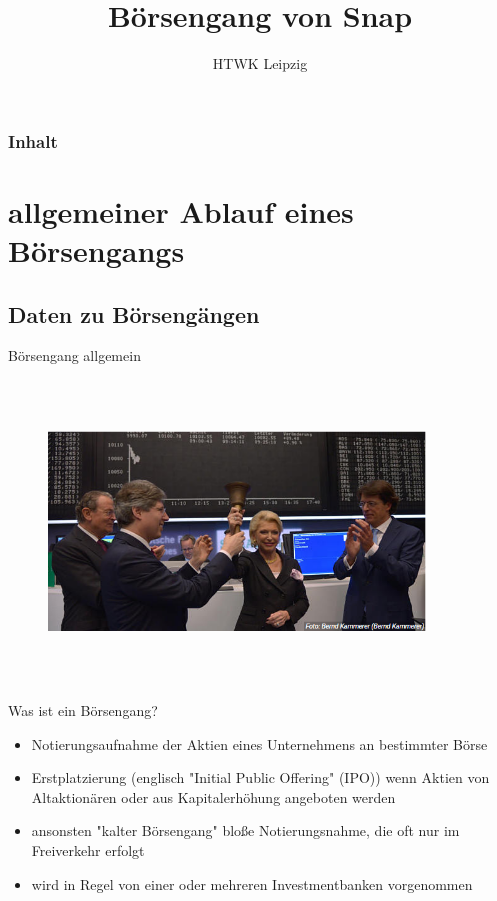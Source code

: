 \documentclass{beamer}
\title{Börsengang von Snap}
\institute{Alex Dudin, Hendrik Schick, Andre Hildebrandt}
\author[]{HTWK Leipzig} %
\begin{document}
\begin{frame}
\titlepage
\end{frame}

\begin{frame}
\frametitle{Inhalt}
\tableofcontents
\end{frame}


\section{allgemeiner Ablauf eines Börsengangs}


\subsection{Daten zu Börsengängen}

\begin{frame} {Börsengang allgemein}
\begin{figure}
	\centering
	\includegraphics[width=10cm, height=8cm]{boersenglockeeinfuehrung.PNG}
\end{figure}
\end{frame}

\begin{frame} {Was ist ein Börsengang?}
\begin{itemize}
\item Notierungsaufnahme der Aktien eines Unternehmens an bestimmter Börse 
\item Erstplatzierung (englisch "Initial Public Offering" (IPO)) wenn Aktien von Altaktionären oder aus Kapitalerhöhung angeboten werden
\item ansonsten "kalter Börsengang" bloße Notierungsnahme, die oft nur im Freiverkehr erfolgt
\item wird in Regel von einer oder mehreren Investmentbanken vorgenommen
\end{itemize}
\end{frame}
\end{document}
